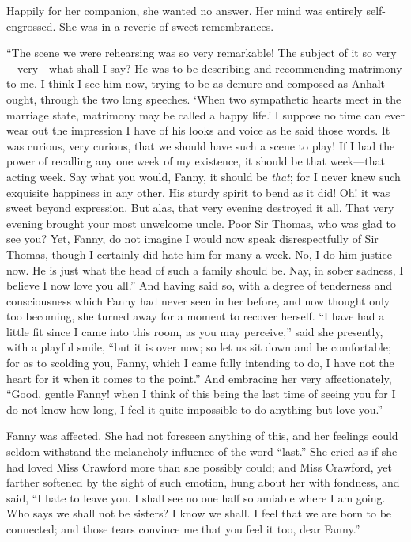 \documentclass{article}
\begin{document}
Happily for her companion, she wanted no answer.
Her mind was entirely self-engrossed. She was in a reverie
of sweet remembrances.

``The scene we were rehearsing was so very remarkable!
The subject of it so very---very---what shall I say?
He was to be describing and recommending matrimony to me.
I think I see him now, trying to be as demure and composed
as Anhalt ought, through the two long speeches.
`When two sympathetic hearts meet in the marriage state,
matrimony may be called a happy life.'  I suppose no time
can ever wear out the impression I have of his looks
and voice as he said those words.  It was curious,
very curious, that we should have such a scene to play!
If I had the power of recalling any one week of my existence,
it should be that week---that acting week.  Say what
you would, Fanny, it should be \emph{that}; for I never knew
such exquisite happiness in any other.  His sturdy spirit
to bend as it did!  Oh! it was sweet beyond expression.
But alas, that very evening destroyed it all.  That very
evening brought your most unwelcome uncle.  Poor Sir Thomas,
who was glad to see you?  Yet, Fanny, do not imagine I would
now speak disrespectfully of Sir Thomas, though I certainly
did hate him for many a week.  No, I do him justice now.
He is just what the head of such a family should be.
Nay, in sober sadness, I believe I now love you all.''
And having said so, with a degree of tenderness and
consciousness which Fanny had never seen in her before,
and now thought only too becoming, she turned away
for a moment to recover herself.  ``I have had a little
fit since I came into this room, as you may perceive,''
said she presently, with a playful smile, ``but it is
over now; so let us sit down and be comfortable; for as to
scolding you, Fanny, which I came fully intending to do,
I have not the heart for it when it comes to the point.''
And embracing her very affectionately, ``Good, gentle Fanny!
when I think of this being the last time of seeing you for I
do not know how long, I feel it quite impossible to do anything
but love you.''

Fanny was affected.  She had not foreseen anything of this,
and her feelings could seldom withstand the melancholy
influence of the word ``last.''  She cried as if she
had loved Miss Crawford more than she possibly could;
and Miss Crawford, yet farther softened by the sight
of such emotion, hung about her with fondness, and said,
``I hate to leave you.  I shall see no one half so amiable
where I am going.  Who says we shall not be sisters?
I know we shall.  I feel that we are born to be connected;
and those tears convince me that you feel it too,
dear Fanny.''
\end{document}

